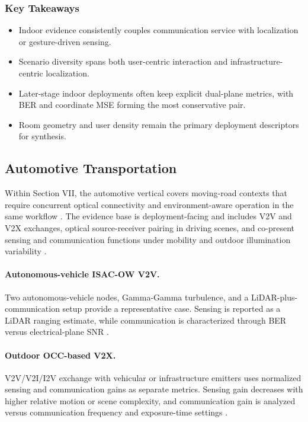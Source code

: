 \subsubsection{Key Takeaways}
\begin{itemize}
\item Indoor evidence consistently couples communication service with localization or gesture-driven sensing.
\item Scenario diversity spans both user-centric interaction and infrastructure-centric localization.
\item Later-stage indoor deployments often keep explicit dual-plane metrics, with BER and coordinate MSE forming the most conservative pair.
\item Room geometry and user density remain the primary deployment descriptors for synthesis.
\end{itemize}

\subsection{Automotive Transportation}
\label{subsec:apps-automotive}

Within Section VII, the automotive vertical covers moving-road contexts that require concurrent optical connectivity and environment-aware operation in the same workflow \cite{O_ISAC_003,O_ISAC_164}. The evidence base is deployment-facing and includes V2V and V2X exchanges, optical source-receiver pairing in driving scenes, and co-present sensing and communication functions under mobility and outdoor illumination variability \cite{O_ISAC_003,O_ISAC_060,O_ISAC_164}.

\paragraph{Autonomous-vehicle ISAC-OW V2V.}
Two autonomous-vehicle nodes, Gamma-Gamma turbulence, and a LiDAR-plus-communication setup provide a representative case. Sensing is reported as a LiDAR ranging estimate, while communication is characterized through BER versus electrical-plane SNR \cite{O_ISAC_060}.

\paragraph{Outdoor OCC-based V2X.}
V2V/V2I/I2V exchange with vehicular or infrastructure emitters uses normalized sensing and communication gains as separate metrics. Sensing gain decreases with higher relative motion or scene complexity, and communication gain is analyzed versus communication frequency and exposure-time settings \cite{O_ISAC_164}.

